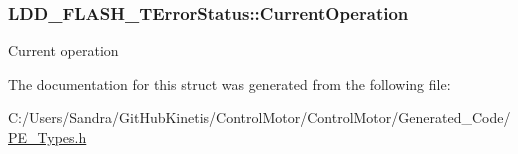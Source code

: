 \subsubsection[{\texorpdfstring{Current\+Operation}{CurrentOperation}}]{ L\+D\+D\+\_\+\+F\+L\+A\+S\+H\+\_\+\+T\+Error\+Status\+::\+Current\+Operation}\hypertarget{struct_l_d_d___f_l_a_s_h___t_error_status_aa1b99bfba14fdc8379522df15da47e7b}{}\label{struct_l_d_d___f_l_a_s_h___t_error_status_aa1b99bfba14fdc8379522df15da47e7b}
Current operation 

The documentation for this struct was generated from the following file\+:\begin{DoxyCompactItemize}
\item 
C\+:/\+Users/\+Sandra/\+Git\+Hub\+Kinetis/\+Control\+Motor/\+Control\+Motor/\+Generated\+\_\+\+Code/\hyperlink{_p_e___types_8h}{P\+E\+\_\+\+Types.\+h}\end{DoxyCompactItemize}
